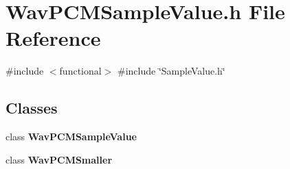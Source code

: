 \section{Wav\+P\+C\+M\+Sample\+Value.\+h File Reference}
\label{WavPCMSampleValue_8h}
{\ttfamily \#include $<$functional$>$}\newline
{\ttfamily \#include \char`\"{}Sample\+Value.\+h\char`\"{}}\newline
\subsection*{Classes}
\begin{DoxyCompactItemize}
\item 
class \textbf{ Wav\+P\+C\+M\+Sample\+Value}
\item 
class \textbf{ Wav\+P\+C\+M\+Smaller}
\end{DoxyCompactItemize}

